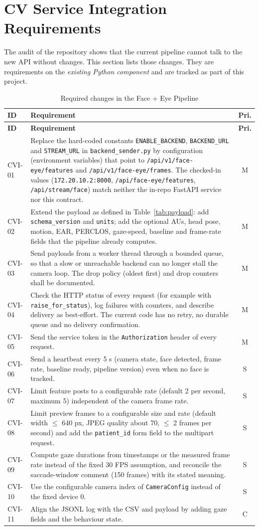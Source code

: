 \documentclass[a4paper,11pt]{scrreprt}
\makeatletter
\newenvironment{reqtable}[1]{%
  \small
  \begin{longtable}{@{}>{\ttfamily\footnotesize}p{2.55cm}>{\raggedright\arraybackslash}p{10.7cm}c@{}}
  \caption{#1}\\
  \toprule \textbf{ID} & \textbf{Requirement} & \textbf{Pri.}\\ \midrule
  \endfirsthead
  \toprule \textbf{ID} & \textbf{Requirement} & \textbf{Pri.}\\ \midrule
  \endhead
  \bottomrule
  \endfoot
}{%
  \end{longtable}\normalsize
}
\newcommand{\req}[3]{#1 & #2 & #3 \\ \midrule}
\newcommand{\code}[1]{\texttt{#1}}
\makeatother
\begin{document}
\section{CV Service Integration Requirements}\label{sec:cvi}
The audit of the repository shows that the current pipeline cannot talk to the new API without changes. This section lists those changes. They are requirements on the \emph{existing Python component} and are tracked as part of this project.
\begin{reqtable}{Required changes in the Face + Eye Pipeline}
\req{CVI-01}{Replace the hard-coded constants \code{ENABLE_BACKEND}, \code{BACKEND_URL} and \code{STREAM_URL} in \code{backend_sender.py} by configuration (environment variables) that point to \code{/api/v1/face-eye/features} and \code{/api/v1/face-eye/frames}. The checked-in values (\code{172.20.10.2:8000}, \code{/api/face-eye/features}, \code{/api/stream/face}) match neither the in-repo FastAPI service nor this contract.}{M}
\req{CVI-02}{Extend the payload as defined in Table~\ref{tab:payload}: add \code{schema_version} and \code{units}; add the optional AUs, head pose, motion, EAR, PERCLOS, gaze-speed, baseline and frame-rate fields that the pipeline already computes.}{M}
\req{CVI-03}{Send payloads from a worker thread through a bounded queue, so that a slow or unreachable backend can no longer stall the camera loop. The drop policy (oldest first) and drop counters shall be documented.}{M}
\req{CVI-04}{Check the HTTP status of every request (for example with \code{raise_for_status}), log failures with counters, and describe delivery as best-effort. The current code has no retry, no durable queue and no delivery confirmation.}{M}
\req{CVI-05}{Send the service token in the \code{Authorization} header of every request.}{M}
\req{CVI-06}{Send a heartbeat every 5 s (camera state, face detected, frame rate, baseline ready, pipeline version) even when no face is tracked.}{S}
\req{CVI-07}{Limit feature posts to a configurable rate (default 2 per second, maximum 5) independent of the camera frame rate.}{S}
\req{CVI-08}{Limit preview frames to a configurable size and rate (default width $\le$ 640 px, JPEG quality about 70, $\le$ 2 frames per second) and add the \code{patient_id} form field to the multipart request.}{S}
\req{CVI-09}{Compute gaze durations from timestamps or the measured frame rate instead of the fixed 30 FPS assumption, and reconcile the saccade-window comment (150 frames) with its stated meaning.}{S}
\req{CVI-10}{Use the configurable camera index of \code{CameraConfig} instead of the fixed device 0.}{S}
\req{CVI-11}{Align the JSONL log with the CSV and payload by adding gaze fields and the behaviour state.}{C}
\end{reqtable}
\end{document}
